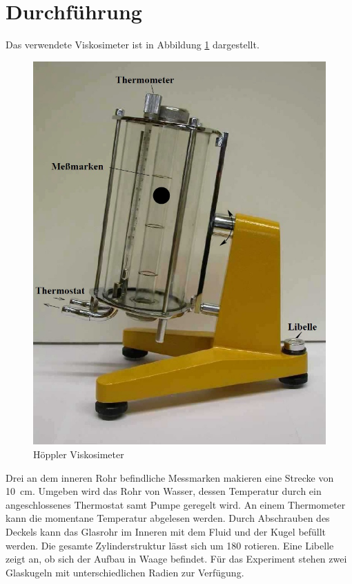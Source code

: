 \section{Durchführung}

Das verwendete Viskosimeter ist in Abbildung \ref{fig:Aufbau} dargestellt. 

\begin{figure}
\center
\includegraphics[scale=0.3]{content/Aufbau.jpg}
\caption{Höppler Viskosimeter}
\label{fig:Aufbau}
\end{figure}

Drei an dem inneren Rohr befindliche Messmarken makieren eine Strecke 
von \SI{10}{\centi\meter}. Umgeben wird das Rohr von Wasser, dessen 
Temperatur durch ein angeschlossenes Thermostat samt Pumpe geregelt wird. 
An einem Thermometer kann die momentane Temperatur abgelesen werden. 
Durch Abschrauben des Deckels kann das Glasrohr im Inneren mit dem Fluid und 
der Kugel befüllt werden. Die gesamte Zylinderstruktur lässt sich um 
\SI{180}{\grad} rotieren. Eine Libelle zeigt an, ob sich der Aufbau in Waage
befindet. Für das Experiment stehen zwei Glaskugeln mit unterschiedlichen
Radien zur Verfügung. 

